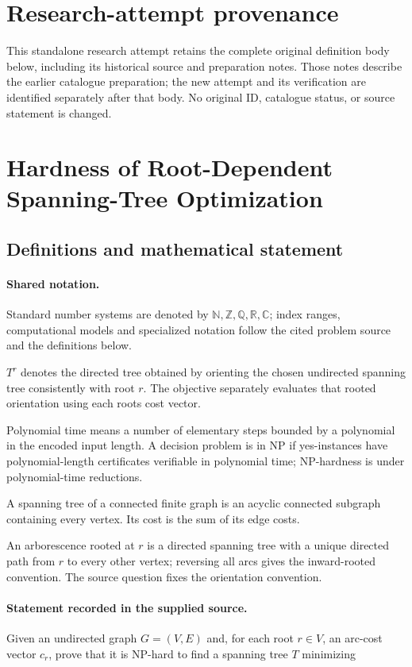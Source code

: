 \documentclass[11pt]{article}
\begin{document}
\section*{Research-attempt provenance}
This standalone research attempt retains the complete original definition body below,
including its historical source and preparation notes. Those notes describe the
earlier catalogue preparation; the new attempt and its verification are identified
separately after that body. No original ID, catalogue status, or source statement is changed.

\section{Hardness of Root-Dependent Spanning-Tree Optimization}\label{statement}

\subsection{Definitions and mathematical statement}

\paragraph{Shared notation.}Standard number systems are denoted by $\mathbb N,\mathbb Z,\mathbb Q,\mathbb R,\mathbb C$; index ranges, computational models and specialized notation follow the cited problem source and the definitions below.


$T^r$ denotes the directed tree obtained by orienting the chosen undirected spanning tree consistently with root $r$. The objective separately evaluates that rooted orientation using each root\textquotesingle s cost vector.

Polynomial time means a number of elementary steps bounded by a polynomial in the encoded input length. A decision problem is in $\mathrm{NP}$ if yes-instances have polynomial-length certificates verifiable in polynomial time; NP-hardness is under polynomial-time reductions.

A spanning tree of a connected finite graph is an acyclic connected subgraph containing every vertex. Its cost is the sum of its edge costs.

An arborescence rooted at $r$ is a directed spanning tree with a unique directed path from $r$ to every other vertex; reversing all arcs gives the inward-rooted convention. The source question fixes the orientation convention.
\paragraph{Statement recorded in the supplied source.}
Given an undirected graph $G=(V,E)$ and, for each root $r\in V$, an arc-cost vector $c_r$, prove that it is NP-hard to find a spanning tree $T$ minimizing
\end{document}
